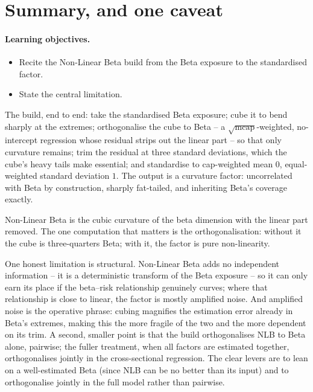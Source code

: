 \documentclass[11pt]{article}
\theoremstyle{definition}
\theoremstyle{plain}
\theoremstyle{remark}
\begin{document}
\section{Summary, and one caveat}\label{sec:summary}

\paragraph{Learning objectives.}
\begin{itemize}[leftmargin=1.4em,topsep=2pt]
  \item Recite the Non-Linear Beta build from the Beta exposure to the standardised factor.
  \item State the central limitation.
\end{itemize}

The build, end to end: take the standardised Beta exposure; cube it to bend sharply at the extremes; orthogonalise the cube to Beta -- a $\sqrt{\text{mcap}}$-weighted, no-intercept regression whose residual strips out the linear part -- so that only curvature remains; trim the residual at three standard deviations, which the cube's heavy tails make essential; and standardise to cap-weighted mean $0$, equal-weighted standard deviation $1$. The output is a curvature factor: uncorrelated with Beta by construction, sharply fat-tailed, and inheriting Beta's coverage exactly.

\begin{keyresult}
Non-Linear Beta is the cubic curvature of the beta dimension with the linear part removed. The one computation that matters is the orthogonalisation: without it the cube is three-quarters Beta; with it, the factor is pure non-linearity.
\end{keyresult}

\begin{pitfall}
One honest limitation is structural. Non-Linear Beta adds no independent information -- it is a deterministic transform of the Beta exposure -- so it can only earn its place if the beta--risk relationship genuinely curves; where that relationship is close to linear, the factor is mostly amplified noise. And amplified noise is the operative phrase: cubing magnifies the estimation error already in Beta's extremes, making this the more fragile of the two and the more dependent on its trim. A second, smaller point is that the build orthogonalises NLB to Beta alone, pairwise; the fuller treatment, when all factors are estimated together, orthogonalises jointly in the cross-sectional regression. The clear levers are to lean on a well-estimated Beta (since NLB can be no better than its input) and to orthogonalise jointly in the full model rather than pairwise.
\end{pitfall}
\end{document}
